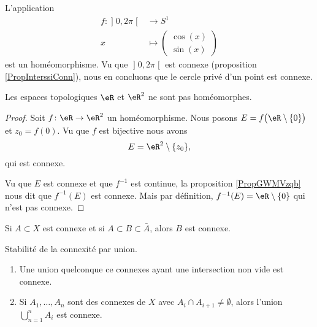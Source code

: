 \begin{example}
    L'application
    \begin{equation}
        \begin{aligned}
            f\colon \mathopen] 0 , 2\pi \mathclose[&\to S^1 \\
                x&\mapsto \begin{pmatrix}
                    \cos(x)    \\ 
                    \sin(x)    
                \end{pmatrix}
        \end{aligned}
    \end{equation}
    est un homéomorphisme. Vu que \( \mathopen] 0 , 2\pi \mathclose[\) est connexe (proposition \ref{PropInterssiConn}), nous en concluons que le cercle privé d'un point est connexe.
\end{example}

\begin{example}
    Les espaces topologiques \( \eR\) et \( \eR^2\) ne sont pas homéomorphes.
\end{example}

\begin{proof}
    Soit \( f\colon \eR\to \eR^2\) un homéomorphisme. Nous posons \( E=f\big( \eR\setminus\{ 0 \} \big)\) et \( z_0=f(0)\). Vu que \( f\) est bijective nous avons
    \begin{equation}
        E=\eR^2\setminus\{ z_0 \},
    \end{equation}
    qui est connexe.

    Vu que \( E\) est connexe et que \( f^{-1}\) est continue, la proposition \ref{PropGWMVzqb} nous dit que \( f^{-1}(E)\) est connexe. Mais par définition, \( f^{-1}(E)=\eR\setminus\{ 0 \}\) qui n'est pas connexe.
\end{proof}


\begin{proposition}
    Si \( A\subset X\) est connexe et si \( A\subset B\subset \bar A\), alors \( B\) est connexe.
\end{proposition}

\begin{proposition} \label{PropIWIDzzH}
    Stabilité de la connexité par union.
    \begin{enumerate}
        \item
    Une union quelconque ce connexes ayant une intersection non vide est connexe.
\item
    Si \( A_1,\ldots, A_n\) sont des connexes de \( X\) avec \( A_i\cap A_{i+1}\neq \emptyset\), alors l'union \( \bigcup_{n=1}^nA_i\) est connexe.
    \end{enumerate}
\end{proposition}

